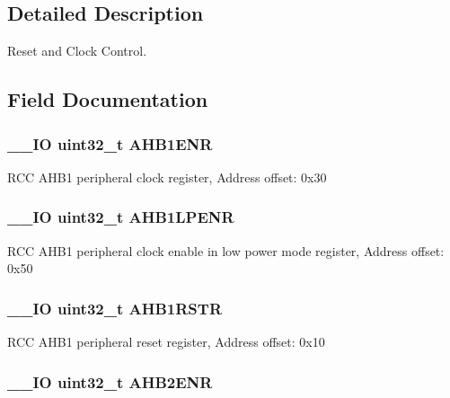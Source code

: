 \subsection{Detailed Description}
Reset and Clock Control. 

\subsection{Field Documentation}
\hypertarget{struct_r_c_c___type_def_a1e9c75b06c99d0611535f38c7b4aa845}{
\subsubsection[{A\-H\-B1\-E\-N\-R}]{\setlength{\rightskip}{0pt plus 5cm}\-\_\-\-\_\-\-I\-O uint32\-\_\-t A\-H\-B1\-E\-N\-R}}\label{struct_r_c_c___type_def_a1e9c75b06c99d0611535f38c7b4aa845}
R\-C\-C A\-H\-B1 peripheral clock register, Address offset\-: 0x30 \hypertarget{struct_r_c_c___type_def_aae70b1922167eb58d564cb82d39fd10b}{
\subsubsection[{A\-H\-B1\-L\-P\-E\-N\-R}]{\setlength{\rightskip}{0pt plus 5cm}\-\_\-\-\_\-\-I\-O uint32\-\_\-t A\-H\-B1\-L\-P\-E\-N\-R}}\label{struct_r_c_c___type_def_aae70b1922167eb58d564cb82d39fd10b}
R\-C\-C A\-H\-B1 peripheral clock enable in low power mode register, Address offset\-: 0x50 \hypertarget{struct_r_c_c___type_def_a46c20c598e9e12f919f0ea47ebcbc90f}{
\subsubsection[{A\-H\-B1\-R\-S\-T\-R}]{\setlength{\rightskip}{0pt plus 5cm}\-\_\-\-\_\-\-I\-O uint32\-\_\-t A\-H\-B1\-R\-S\-T\-R}}\label{struct_r_c_c___type_def_a46c20c598e9e12f919f0ea47ebcbc90f}
R\-C\-C A\-H\-B1 peripheral reset register, Address offset\-: 0x10 \hypertarget{struct_r_c_c___type_def_a5e92ed32c33c92e7ebf6919400ad535b}{
\subsubsection[{A\-H\-B2\-E\-N\-R}]{\setlength{\rightskip}{0pt plus 5cm}\-\_\-\-\_\-\-I\-O uint32\-\_\-t A\-H\-B2\-E\-N\-R}}\label{struct_r_c_c___type_def_a5e92ed32c33c92e7ebf6919400ad535b}
